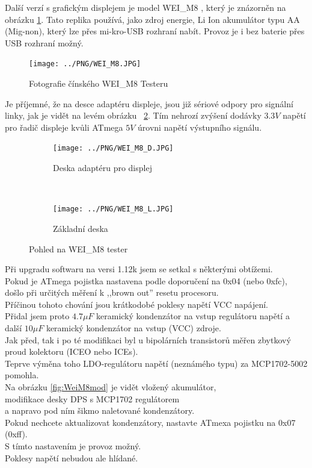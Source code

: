 Další verzí s grafickým displejem je model WEI\_M8 , který je znázorněn na obrázku \ref{fig:WeiM8}.
Tato replika používá, jako zdroj energie, Li Ion akumulátor typu AA (Mig-non), který lze přes
mi-kro-USB rozhraní nabít. Provoz je i bez baterie přes USB rozhraní možný.

\begin{figure}[H]
\centering
\texttt{[image: ../PNG/WEI\_M8.JPG]}
\caption{Fotografie čínského WEI\_M8 Testeru}
\label{fig:WeiM8}
\end{figure}

Je příjemné, že na desce adaptéru displeje, jsou již sériové odpory pro signální linky, jak je vidět
na levém obrázku ~\ref{fig:WeiM8int}. Tím nehrozí zvýšení dodávky \(3.3V\) napětí pro řadič displeje kvůli
ATmega \(5V\) úrovni napětí výstupního signálu.

\begin{figure}[H]
  \begin{subfigure}[b]{9cm}
    \centering
    \texttt{[image: ../PNG/WEI\_M8\_D.JPG]}
    \caption{Deska adaptéru pro displej}
  \end{subfigure}
  ~
  \begin{subfigure}[b]{9cm}
    \centering
    \texttt{[image: ../PNG/WEI\_M8\_L.JPG]}
    \caption{Základní deska}
  \end{subfigure}
  \caption{Pohled na  WEI\_M8 tester}
  \label{fig:WeiM8int}
\end{figure}


Při upgradu softwaru na versi 1.12k jsem se setkal s některými obtížemi.\\
Pokud je ATmega pojistka nastavena podle doporučení na 0x04 (nebo 0xfc), došlo při určitých měření
k ,,brown out'' resetu procesoru.\\
Příčinou tohoto chování jsou krátkodobé poklesy napětí VCC napájení.\\
Přidal jsem proto  \(4.7\mu F\) keramický kondenzátor na vstup regulátoru napětí a další \(10\mu F\) keramický kondenzátor na vstup (VCC) zdroje.\\
Jak před, tak i po té modifikaci byl u bipolárních transistorů měřen zbytkový proud kolektoru (ICEO nebo ICEs).\\
Teprve výměna toho LDO-regulátoru napětí (neznámého typu) za MCP1702-5002 pomohla.\\
Na obrázku \ref{fig:WeiM8mod} je vidět vložený akumulátor,\\
modifikace desky DPS s MCP1702 regulátorem\\ a napravo pod ním šikmo naletované kondenzátory.\\
Pokud nechcete aktualizovat kondenzátory, nastavte ATmexa pojistku na 0x07 (0xff).\\
S tímto nastavením je provoz možný.\\
Poklesy napětí nebudou ale hlídané.

